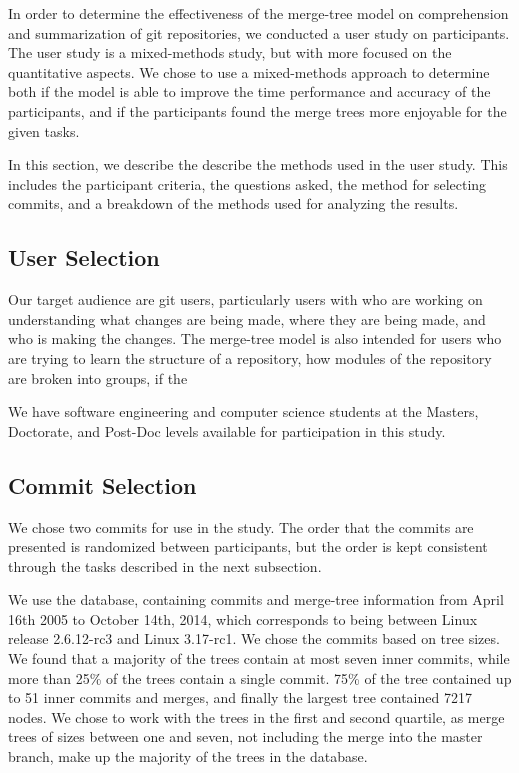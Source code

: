 
In order to determine the effectiveness of the merge-tree model on
comprehension and summarization of git repositories, we conducted a user
study on  participants. The user study is a
mixed-methods study, but with more focused on the quantitative aspects.
We chose to use a mixed-methods approach to determine both if the model
is able to improve the time performance and accuracy of the
participants, and if the participants found the merge trees more
enjoyable for the given tasks.

In this section, we describe the describe the methods used in the user
study. This includes the participant criteria, the questions asked, the
method for selecting commits, and a breakdown of the methods used for
analyzing the results.

\subsection{User Selection}
\label{sub:user_selection}

Our target audience are git users, particularly users with who are
working on understanding what changes are being made, where they are
being made, and who is making the changes. The merge-tree model is also
intended for users who are trying to learn the structure of a
repository, how modules of the repository are broken into groups, if the

We have software engineering and computer science students at the
Masters, Doctorate, and Post-Doc levels available for participation in
this study. 


\subsection{Commit Selection}
\label{sub:commit_selection}

We chose two commits for use in the study. The order that the commits
are presented is randomized between participants, but the order is kept
consistent through the tasks described in the next subsection.

We use the \tool database, containing commits and merge-tree information
from April 16th 2005 to October 14th, 2014, which corresponds to being
between Linux release 2.6.12-rc3 and Linux 3.17-rc1.  We chose the commits based on tree sizes. We
found that a majority of the trees contain at most seven inner commits,
while more than 25\% of the trees contain a single commit. 75\% of the
tree contained up to 51 inner commits and merges, and finally the
largest tree contained 7217 nodes. We chose to work with the trees in
the first and second quartile, as merge trees of sizes between one and
seven, not including the merge into the master branch, make up the
majority of the trees in the database.

